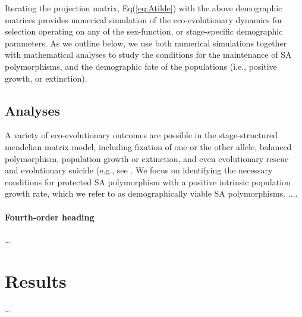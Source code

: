 \documentclass[11pt]{article}
\begin{document}
Iterating the projection matrix, Eq(\ref{eq:Atilde}) with the above demographic matrices provides numerical simulation of the eco-evolutionary dynamics for selection operating on any of the sex-function, or stage-specific demographic parameters. As we outline below, we use both numerical simulations together with mathematical analyses to study the conditions for the maintenance of SA polymorphisms, and the demographic fate of the populations (i.e., positive growth, or extinction).

\subsection*{Analyses} \label{sec:analyses}

A variety of eco-evolutionary outcomes are possible in the stage-structured mendelian matrix model, including fixation of one or the other allele, balanced polymorphism, population growth or extinction, and even evolutionary rescue and evolutionary suicide (e.g., see \citealt{CaswellEtAl2018,deVriesCaswell2019a,deVriesCaswell2019b}. We focus on identifying the necessary conditions for protected SA polymorphism with a positive intrinsic population growth rate, which we refer to as demographically viable SA polymorphisms. ....


\paragraph*{Fourth-order heading}
\ldots


\section*{Results}
\ldots
\end{document}
